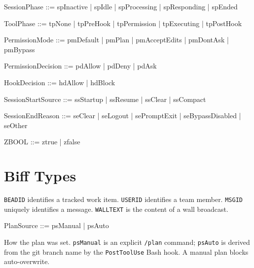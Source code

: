 \documentclass[a4paper,10pt,fleqn]{article}
\begin{document}
\begin{zed}
  SessionPhase ::= spInactive | spIdle | spProcessing | spResponding | spEnded
\end{zed}

\begin{zed}
  ToolPhase ::= tpNone | tpPreHook | tpPermission | tpExecuting | tpPostHook
\end{zed}

\begin{zed}
  PermissionMode ::= pmDefault | pmPlan | pmAcceptEdits | pmDontAsk | pmBypass
\end{zed}

\begin{zed}
  PermissionDecision ::= pdAllow | pdDeny | pdAsk
\end{zed}

\begin{zed}
  HookDecision ::= hdAllow | hdBlock
\end{zed}

\begin{zed}
  SessionStartSource ::= ssStartup | ssResume | ssClear | ssCompact
\end{zed}

\begin{zed}
  SessionEndReason ::= seClear | seLogout | sePromptExit | seBypassDisabled | seOther
\end{zed}

\begin{zed}
  ZBOOL ::= ztrue | zfalse
\end{zed}

\section{Biff Types}

\begin{zed}
\end{zed}

\texttt{BEADID} identifies a tracked work item. \texttt{USERID}
identifies a team member. \texttt{MSGID} uniquely identifies a
message. \texttt{WALLTEXT} is the content of a wall broadcast.

\begin{zed}
  PlanSource ::= psManual | psAuto
\end{zed}

How the plan was set. \texttt{psManual} is an explicit \texttt{/plan}
command; \texttt{psAuto} is derived from the git branch name by the
\texttt{PostToolUse} Bash hook. A manual plan blocks auto-overwrite.
\end{document}
